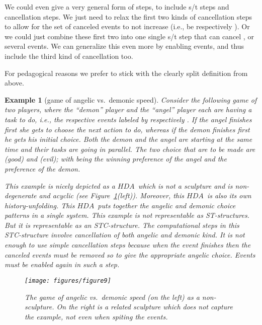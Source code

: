 \documentclass[submission,copyright,creativecommons]{eptcs}
\newtheorem{example}[theorem]{Example}
\newcommand\HDA{\ensuremath{\mathit{HDA}}}
\begin{document}
We could even give a very general form of steps, to include s/t steps and cancellation steps. We just need to relax the first two kinds of cancellation steps to allow for the set of canceled events to not increase (i.e., be  respectively ). Or we could just combine these first two into one single s/t step that can cancel , or several events. We can generalize this even more by enabling events, and thus include the third kind of cancellation too.

For pedagogical reasons we prefer to stick with the clearly split definition from above.

\begin{example}[game of angelic vs.\ demonic speed]\label{ex_game_angelic_vs_demonic}
Consider the following game of two players, where the ``demon'' player and the ``angel'' player each are having a task to do, i.e., the respective events labeled by  respectively . If the angel finishes first she gets to choose the next action to do, whereas if the demon finishes first he gets his initial choice. Both the demon and the angel are starting at the same time and their tasks are going in parallel. The two choice that are to be made are  (good) and  (evil); with  being the winning preference of the angel and  the preference of the demon.

This example is nicely depicted as a \HDA\ which is not a sculpture and is non-degenerate and acyclic (see Figure~\ref{fig_ex_angelicdemonic_game}(left)). Moreover, this \HDA\ is also its own history-unfolding. This \HDA\ puts together the angelic and demonic choice patterns in a single system. This example is not representable as ST-structures.
But it is representable as an STC-structure.
The computational steps in this STC-structure involve cancellation of both angelic and demonic kind. It is not enough to use simple cancellation steps because when the  event finishes then the canceled events must be removed so to give the appropriate angelic choice. Events must be enabled again in such a step.

\begin{figure}[tp]
  \begin{center}
    \hspace{-2ex}\texttt{[image: figures/figure9]}
  \end{center}
\caption{The game of angelic vs.\ demonic speed (on the left) as a non-sculpture. \newline On the right is a related sculpture which does not capture the example, not even when spiting the events.
}
\label{fig_ex_angelicdemonic_game}
\end{figure}
\end{example}
\end{document}
